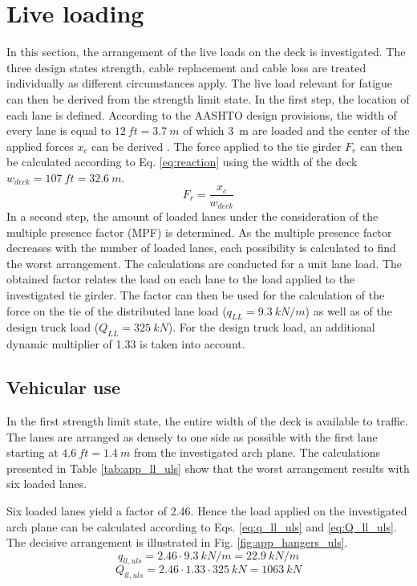 \section{Live loading} \label{Appendix_Liveloading}
In this section, the arrangement of the live loads on the deck is investigated. The three design states strength, cable replacement and cable loss are treated individually as different circumstances apply. The live load relevant for fatigue can then be derived from the strength limit state. In the first step, the location of each lane is defined. According to the AASHTO design provisions, the width of every lane is equal to $\SI{12}{ft} = \SI{3.7}{m}$ of which \SI{3}{m} are loaded and the center of the applied forces $x_c$ can be derived \cite{AASHTO}. The force applied to the tie girder $F_r$ can then be calculated according to Eq. \ref{eq:reaction} using the width of the deck $w_{deck}=\SI{107}{ft}=\SI{32.6}{m}$.
\begin{equation}
    F_r = \frac{x_c}{w_{deck}}
    \label{eq:reaction}
\end{equation}
In a second step, the amount of loaded lanes under the consideration of the multiple presence factor (MPF) is determined. As the multiple presence factor decreases with the number of loaded lanes, each possibility is calculated to find the worst arrangement. The calculations are conducted for a unit lane load. The obtained factor relates the load on each lane to the load applied to the investigated tie girder. The factor can then be used for the calculation of the force on the tie of the distributed lane load ($q_{LL}=\SI{9.3}{kN/m}$) as well as of the design truck load ($Q_{LL}=\SI{325}{kN}$). For the design truck load, an additional dynamic multiplier of 1.33 is taken into account. 

\subsection*{Vehicular use} \label{Appendx_A_Live_loading_1}
In the first strength limit state, the entire width of the deck is available to traffic. The lanes are arranged as densely to one side as possible with the first lane starting at $\SI{4.6}{ft}=\SI{1.4}{m}$ from the investigated arch plane. The calculations presented in Table \ref{tab:app_ll_uls} show that the worst arrangement results with six loaded lanes. 



Six loaded lanes yield a factor of 2.46. Hence the load applied on the investigated arch plane can be calculated according to Eqs. \eqref{eq:q_ll_uls} and \eqref{eq:Q_ll_uls}. The decisive arrangement is illustrated in Fig. \ref{fig:app_hangers_uls}.
\begin{equation}
    q_{ll, uls} = 2.46 \cdot \SI{9.3}{kN/m} = \SI{22.9}{kN/m}
    \label{eq:q_ll_uls}
\end{equation}
\begin{equation}
    Q_{ll, uls} = 2.46 \cdot 1.33 \cdot \SI{325}{kN} = \SI{1063}{kN}
    \label{eq:Q_ll_uls}
\end{equation}

